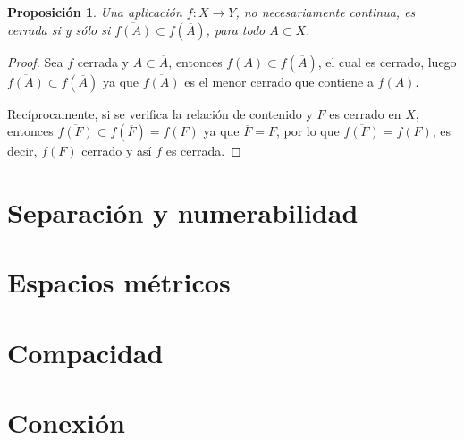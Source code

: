 \documentclass[12pt]{article}
\newtheorem{proposition}[theorem]{Proposición}
\begin{document}
\begin{proposition}Una aplicación $f \colon X \longrightarrow Y$, no necesariamente continua, es cerrada si y sólo si $\overline{f(A)} \subset f(\overline{A})$, para todo $A \subset X$.
\end{proposition}
\begin{proof}
Sea $f$ cerrada y $A \subset \overline{A}$, entonces $f(A) \subset f(\overline{A})$, el cual es cerrado, luego $\overline{f(A)} \subset f(\overline{A})$ ya que $\overline{f(A)}$ es el menor cerrado que contiene a $f(A)$.

Recíprocamente, si se verifica la relación de contenido y $F$ es cerrado en $X$, entonces $\overline{f(F)} \subset f(\overline{F}) = f(F)$ ya que $\overline{F} = F$, por lo que $\overline{f(F)} = f(F)$, es decir, $f(F)$ cerrado y así $f$ es cerrada.

\end{proof}

\section{Separación y numerabilidad}
\section{Espacios métricos}
\section{Compacidad}
\section{Conexión}
\end{document}
